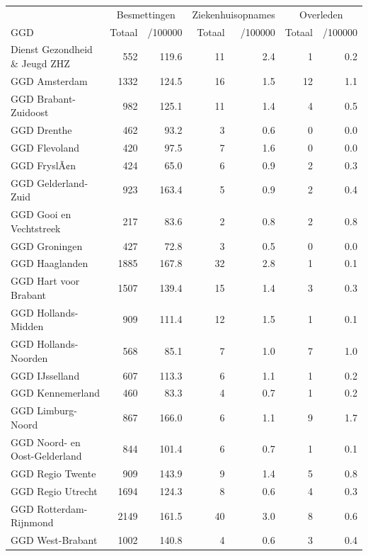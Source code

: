 \documentclass[
  english,
  man,floatsintext]{apa6}
\begin{document}
\begin{table}
\centering\begingroup\fontsize{10}{12}\selectfont

\begin{threeparttable}
\begin{tabular}{lrrrrrr}
\toprule
\multicolumn{1}{c}{ } & \multicolumn{2}{c}{Besmettingen} & \multicolumn{2}{c}{Ziekenhuisopnames} & \multicolumn{2}{c}{Overleden} \\
\cmidrule(l{3pt}r{3pt}){2-3} \cmidrule(l{3pt}r{3pt}){4-5} \cmidrule(l{3pt}r{3pt}){6-7}
GGD & Totaal & /100000 & Totaal & /100000 & Totaal & /100000\\
\midrule
Dienst Gezondheid \& Jeugd ZHZ & 552 & 119.6 & 11 & 2.4 & 1 & 0.2\\
GGD Amsterdam & 1332 & 124.5 & 16 & 1.5 & 12 & 1.1\\
GGD Brabant-Zuidoost & 982 & 125.1 & 11 & 1.4 & 4 & 0.5\\
GGD Drenthe & 462 & 93.2 & 3 & 0.6 & 0 & 0.0\\
GGD Flevoland & 420 & 97.5 & 7 & 1.6 & 0 & 0.0\\
GGD FryslÃ¢n & 424 & 65.0 & 6 & 0.9 & 2 & 0.3\\
GGD Gelderland-Zuid & 923 & 163.4 & 5 & 0.9 & 2 & 0.4\\
GGD Gooi en Vechtstreek & 217 & 83.6 & 2 & 0.8 & 2 & 0.8\\
GGD Groningen & 427 & 72.8 & 3 & 0.5 & 0 & 0.0\\
GGD Haaglanden & 1885 & 167.8 & 32 & 2.8 & 1 & 0.1\\
GGD Hart voor Brabant & 1507 & 139.4 & 15 & 1.4 & 3 & 0.3\\
GGD Hollands-Midden & 909 & 111.4 & 12 & 1.5 & 1 & 0.1\\
GGD Hollands-Noorden & 568 & 85.1 & 7 & 1.0 & 7 & 1.0\\
GGD IJsselland & 607 & 113.3 & 6 & 1.1 & 1 & 0.2\\
GGD Kennemerland & 460 & 83.3 & 4 & 0.7 & 1 & 0.2\\
GGD Limburg-Noord & 867 & 166.0 & 6 & 1.1 & 9 & 1.7\\
GGD Noord- en Oost-Gelderland & 844 & 101.4 & 6 & 0.7 & 1 & 0.1\\
GGD Regio Twente & 909 & 143.9 & 9 & 1.4 & 5 & 0.8\\
GGD Regio Utrecht & 1694 & 124.3 & 8 & 0.6 & 4 & 0.3\\
GGD Rotterdam-Rijnmond & 2149 & 161.5 & 40 & 3.0 & 8 & 0.6\\
GGD West-Brabant & 1002 & 140.8 & 4 & 0.6 & 3 & 0.4\\

\end{tabular}
\end{threeparttable}
\end{table}
\end{document}
